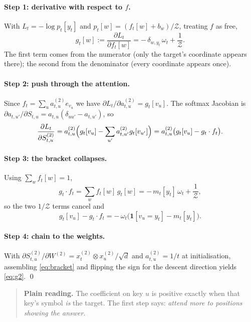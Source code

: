 \documentclass[11pt,a4paper]{article}
\theoremstyle{plain}
\theoremstyle{definition}
\newcommand{\1}{\mathbf{1}}
\begin{document}
\paragraph{Step 1: derivative with respect to $f$.}
With $L_t=-\log p_t[y_t]$ and $p_t[w]=(f_t[w]+b_w)/\mathcal{Z}$, treating $f$ as free,
\begin{equation}
g_t[w]:=\frac{\partial L_t}{\partial f_t[w]}=-\,\delta_{w,y_t}\,\omega_t+\frac{1}{\mathcal{Z}} .
\end{equation}
The first term comes from the numerator (only the target's coordinate appears there); the second
from the denominator (every coordinate appears once).

\paragraph{Step 2: push through the attention.}
Since $f_t=\sum_ua^{(2)}_{t,u}e_{v_u}$ we have $\partial L_t/\partial a^{(2)}_{t,u}=g_t[v_u]$.
The softmax Jacobian is $\partial a_{t,u'}/\partial S_{t,u}=a_{t,u}(\delta_{uu'}-a_{t,u'})$, so
\begin{equation}
\frac{\partial L_t}{\partial S^{(2)}_{t,u}}
=a^{(2)}_{t,u}\Bigl(g_t[v_u]-\sum_{u'}a^{(2)}_{t,u'}g_t[v_{u'}]\Bigr)
=a^{(2)}_{t,u}\bigl(g_t[v_u]-g_t\cdot f_t\bigr).
\end{equation}

\paragraph{Step 3: the bracket collapses.}
Using $\sum_wf_t[w]=1$,
\begin{equation}
g_t\cdot f_t=\sum_wf_t[w]\,g_t[w]=-\,m_t[y_t]\,\omega_t+\frac{1}{\mathcal{Z}},
\end{equation}
so the two $1/\mathcal{Z}$ terms cancel and
\begin{equation}\label{eq:bracket}
g_t[v_u]-g_t\cdot f_t=-\,\omega_t\bigl(\1[v_u=y_t]-m_t[y_t]\bigr).
\end{equation}

\paragraph{Step 4: chain to the weights.}
With $\partial S^{(2)}_{t,u}/\partial W^{(2)}=x^{(2)}_t\otimes x^{(2)}_u/\sqrt d$ and
$a^{(2)}_{t,u}=1/t$ at initialisation, assembling \eqref{eq:bracket} and flipping the sign for the
descent direction yields \eqref{eq:g2}. \qed

\begin{quote}
\textbf{Plain reading.} The coefficient on key $u$ is positive exactly when that key's symbol
\emph{is} the target. The first step says: \emph{attend more to positions showing the answer}.
\end{quote}
\end{document}
